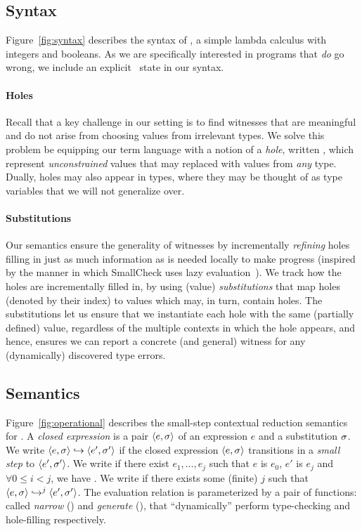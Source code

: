 \subsection{Syntax}
\label{sec:syntax}

%
Figure~\ref{fig:syntax} describes the syntax of \lang, a simple lambda
calculus with integers and booleans.
%
As we are specifically interested in programs that \emph{do} go wrong,
we include an explicit \stuck\ state in our syntax.

\paragraph{Holes}
\label{sec:holes}
%
Recall that a key challenge in our setting is to find witnesses
that are meaningful and do not arise from choosing values from
irrelevant types.
%
We solve this problem be equipping our term language with a notion
of a \emph{hole}, written \ehole{}, which represent \emph{unconstrained}
values that may replaced with values from \emph{any} type.
%
Dually, holes may also appear in types, where they may be thought
of as type variables that we will not generalize over.
%

\paragraph{Substitutions}
%
Our semantics ensure the generality of witnesses by incrementally
\emph{refining} holes filling in just as much information as is
needed locally to make progress (inspired by the manner in
which SmallCheck uses lazy evaluation~\cite{smallcheck}).
%
We track how the holes are incrementally filled in, by using
(value) \emph{substitutions} that map holes (denoted by their index)
to values which may, in turn, contain holes.
%
The substitutions let us ensure that we instantiate each hole
with the same (partially defined) value, regardless of the multiple
contexts in which the hole appears, and hence, ensures we can
report a concrete (and general) witness for any (dynamically)
discovered type errors.

\subsection{Semantics}
\label{sec:semantics}

%
Figure~\ref{fig:operational} describes the small-step contextual
reduction semantics for \lang.
%
A \emph{closed expression} is a pair $\pair{e}{\vsu}$ of an expression $e$
and a substitution $\vsu$.
%
We write $\step{e}{\vsu}{e'}{\vsu'}$ if the closed expression $\pair{e}{\vsu}$
transitions in a \emph{small step} to $\pair{e'}{\vsu'}$.
%
We write  if there exist $e_1,\ldots,e_j$ such that
$e$ is $e_0$, $e'$ is $e_j$ and $\forall 0 \leq i < j$, we have
.
%
We write  if there exists some (finite) $j$ such that
$\stepi{j}{e}{\su}{e'}{\su'}$.
%
The evaluation relation is parameterized by a pair of functions:
called \emph{narrow} (\forcesym) and \emph{generate} (\gensym),
that ``dynamically'' perform type-checking and hole-filling
respectively.

